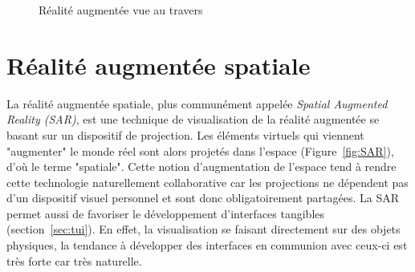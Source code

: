 \begin{figure}[H]
    \centering
\caption{Réalité augmentée vue au travers\protect\footnotemark}
\label{fig:STAR}
\end{figure}

\section{Réalité augmentée spatiale}
La réalité augmentée spatiale\cite{bimber2005spatial}, plus communément appelée \emph{Spatial Augmented Reality (SAR)}, est une technique de visualisation de la réalité augmentée se basant sur un dispositif de projection. Les éléments virtuels qui viennent "augmenter" le monde réel sont alors projetés dans l'espace (Figure~\ref{fig:SAR}), d'où le terme "spatiale". Cette notion d'augmentation de l'espace tend à rendre cette technologie naturellement collaborative car les projections ne dépendent pas d'un dispositif visuel personnel et sont donc obligatoirement partagées. La SAR permet aussi de favoriser le développement d'interfaces tangibles (section~\ref{sec:tui}). En effet, la visualisation se faisant directement sur des objets physiques, la tendance à développer des interfaces en communion avec ceux-ci est très forte car très naturelle.

